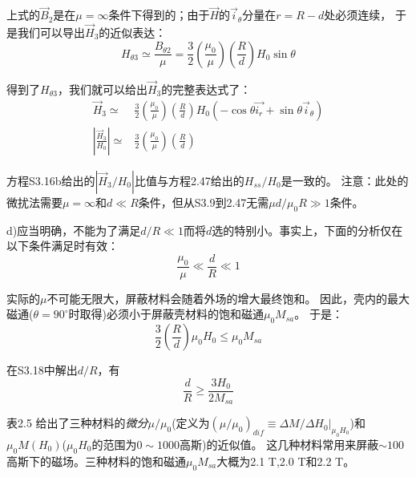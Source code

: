 上式的$\vec{B}_2$是在$\mu=\infty$条件下得到的；由于$\vec{H}$的$\vec{i}_\theta$分量在$r=R-d$处必须连续，
于是我们可以导出$\vec{H}_3$的近似表达：
\begin{equation*}
H_{\theta 3}\simeq \frac{B_{\theta 2}}{\mu}=\frac{3}{2}\left(\frac{\mu_0}{\mu}\right)\left(\frac{R}{d}\right)H_0\sin\theta \tag{S3.15}
\end{equation*}

得到了$H_{\theta 3}$，我们就可以给出$\vec{H}_3$的完整表达式了：
\begin{align}
\vec{H}_3\simeq &\frac{3}{2}\left(\frac{\mu_0}{\mu}\right)\left(\frac{R}{d}\right)H_0(-\cos\theta\vec{i_r}+\sin\theta\vec{i}_\theta) \nonumber\tag{S3.16a}\\
\left|\frac{\vec{H}_3}{H_0}\right|\simeq& \frac{3}{2}\left(\frac{\mu_0}{\mu}\right)\left(\frac{R}{d}\right) \nonumber\tag{S3.16b}
\end{align}

方程S3.16b给出的$\left|{\vec{H}_3}/{H_0}\right|$比值与方程2.47给出的$H_{ss}/H_0$是一致的。
注意：此处的微扰法需要$\mu=\infty$和$d\ll R$条件，但从S3.9到2.47无需$\mu d/\mu_0 R \gg 1$条件。

d)应当明确，不能为了满足$d/R \ll 1$而将$d$选的特别小。事实上，下面的分析仅在以下条件满足时有效：
\begin{equation*}
\frac{\mu_0}{\mu} \ll \frac{d}{R} \ll 1 \tag{S3.17}
\end{equation*}

实际的$\mu$不可能无限大，屏蔽材料会随着外场的增大最终饱和。
因此，壳内的最大磁通($\theta=90^\circ$时取得)必须小于屏蔽壳材料的饱和磁通$\mu_0 M_{sa}$。
于是：
\begin{equation*}
\frac{3}{2}\left(\frac{R}{d}\right)\mu_0 H_0 \le \mu_0 M_{sa}  \tag{S3.18}
\end{equation*}

在S3.18中解出$d/R$，有
\begin{equation*}
\frac{d}{R}\ge \frac{3H_0}{2M_{sa}}  \tag{2.48}
\end{equation*}

表2.5 给出了三种材料的\textit{微分}$\mu/\mu_0$(定义为$(\mu/\mu_0)_{dif}\equiv \Delta M/ \Delta H_0 |_{\mu_0 H_0}$)和$\mu_0M(H_0)$($\mu_0 H_0$的范围为$0\sim 1000$高斯)的近似值。
这几种材料常用来屏蔽$\sim 100$高斯下的磁场。三种材料的饱和磁通$\mu_0 M_{sa}$大概为2.1 T,2.0 T和2.2 T。

